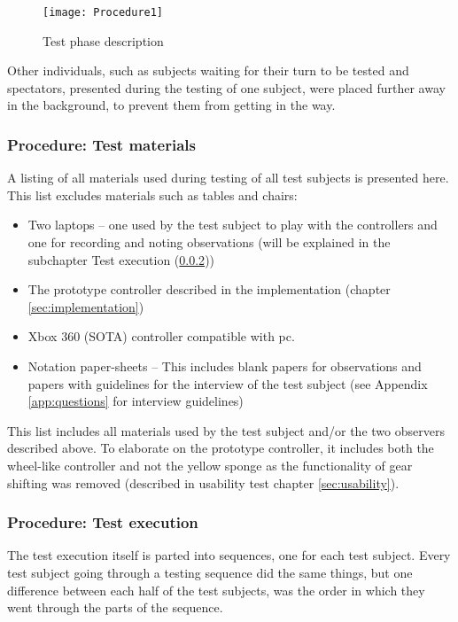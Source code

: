 \begin{figure}[!htbp]
\centering
\texttt{[image: Procedure1]}
\caption{Test phase description} \label{fig:testsetup}
\end{figure}

Other individuals, such as subjects waiting for their turn to be tested and spectators, presented during the testing of one subject, were placed further away in the background, to prevent them from getting in the way.


\subsubsection{Procedure: Test materials}
A listing of all materials used during testing of all test subjects is presented here. 
This list excludes materials such as tables and chairs:
\begin{itemize}
\item Two laptops – one used by the test subject to play with the controllers and one for recording and noting observations (will be explained in the subchapter Test execution (\ref{sec:testexecution}))
\item The prototype controller described in the implementation (chapter \ref{sec:implementation})
\item Xbox 360 (SOTA) controller compatible with pc.
\item Notation paper-sheets – This includes blank papers for observations and papers with guidelines for the interview of the test subject (see Appendix \ref{app:questions} for interview guidelines)

\end{itemize}

This list includes all materials used by the test subject and/or the two observers described above. 
To elaborate on the prototype controller, it includes both the wheel-like controller and not the yellow sponge as the functionality of gear shifting was removed (described in usability test chapter \ref{sec:usability}).

\subsubsection{Procedure: Test execution} \label{sec:testexecution}
The test execution itself is parted into sequences, one for each test subject. 
Every test subject going through a testing sequence did the same things, but one difference between each half of the test subjects, was the order in which they went through the parts of the sequence.


